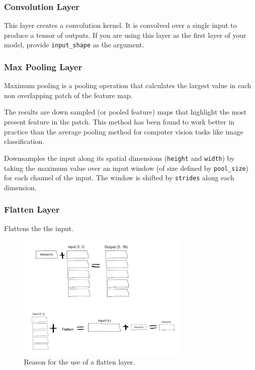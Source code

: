 \documentclass[12pt]{article}
\theoremstyle{mytheoremstyle}
\theoremstyle{mytheoremstyle}
\theoremstyle{myproblemstyle}
\begin{document}
    \subsubsection{Convolution Layer}
    This layer creates a convolution kernel. It is convolved over a single input to produce a tensor of outputs. If you are using this layer as the first layer of your model, provide \texttt{input\_shape} as the argument.
  
    \subsubsection{Max Pooling Layer}
    Maximum pooling is a pooling operation that calculates the largest value in each non overlapping patch of the feature map.
    
    The results are down sampled (or pooled feature) maps that highlight the most present feature in the patch. This method has been found to work better in practice than the average pooling method for computer vision tasks like image classification.
    
    Downsamples the input along its spatial dimensions (\texttt{height} and \texttt{width}) by taking the maximum value over an input window (of size defined by \texttt{pool\_size}) for each channel of the input. The window is shifted by \texttt{strides} along each dimension.

    \subsubsection{Flatten Layer}
    Flattens the the input.
    
    \begin{figure}[H]
      \centering
      \includegraphics[width=0.75\textwidth]{images/flatten.jpg}
      \caption{Reason for the use of a flatten layer.}
    \end{figure}
    
\end{document}
